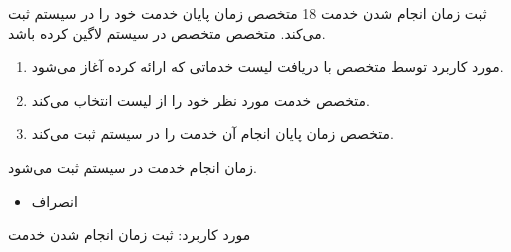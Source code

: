 {
\usecase
{ثبت زمان انجام شدن خدمت}
{18}
{متخصص زمان پایان خدمت خود را در سیستم ثبت می‌کند.}
{متخصص}
{}
{متخصص در سیستم لاگین کرده باشد.}
{
	\vspace*{-0.6cm}
	\begin{enumerate}
		\item مورد کاربرد توسط متخصص با دریافت لیست خدماتی که ارائه کرده آغاز می‌شود.
		\item متخصص خدمت مورد نظر خود را از لیست انتخاب می‌کند.
		\item متخصص زمان پایان انجام آن خدمت را در سیستم ثبت می‌کند.
	\end{enumerate}
}
{زمان انجام خدمت در سیستم ثبت می‌شود.}
{
	\begin{itemize}
		\vspace*{-0.6cm}
		\item انصراف
	\end{itemize}
}
{
	مورد کاربرد: ثبت زمان انجام شدن خدمت
}

}



